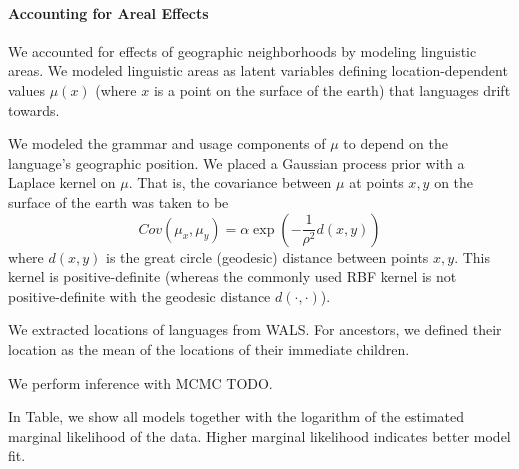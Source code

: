 \documentclass[11pt,a4paper]{article}
\begin{document}
\paragraph{Accounting for Areal Effects}
We accounted for effects of geographic neighborhoods by modeling linguistic areas.
We modeled linguistic areas as latent variables defining location-dependent values $\mu(x)$ (where $x$ is a point on the surface of the earth) that languages drift towards.

We modeled the grammar and usage components of $\mu$ to depend on the language's geographic position.
We placed a Gaussian process prior with a Laplace kernel on $\mu$. 
That is, the covariance between $\mu$ at points $x, y$ on the surface of the earth was taken to be
\begin{equation}
    Cov(\mu_x, \mu_y) = \alpha \exp\left(-\frac{1}{\rho^2} d(x,y)\right)
\end{equation}
where $d(x,y)$ is the great circle (geodesic) distance between points $x, y$.
This kernel is positive-definite (whereas the commonly used RBF kernel is not positive-definite with the geodesic distance $d(\cdot, \cdot)$).

We extracted locations of languages from WALS.
For ancestors, we defined their location as the mean of the locations of their immediate children.


We perform inference with MCMC TODO.

In Table, we show all models together with the logarithm of the estimated marginal likelihood of the data.
Higher marginal likelihood indicates better model fit.
\end{document}
